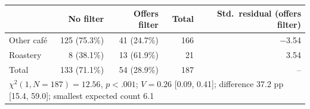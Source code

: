 \begin{tabular}{lrrrr}
\toprule
  & No filter & Offers filter & Total & Std.\ residual (offers filter) \\
\midrule
Other caf\'e & 125 (75.3\%) & 41 (24.7\%) & 166 & \ensuremath{-}3.54 \\
Roastery & 8 (38.1\%) & 13 (61.9\%) &  21 & 3.54 \\
\midrule
Total & 133 (71.1\%) & 54 (28.9\%) & 187 & -- \\
\midrule
\multicolumn{5}{l}{$\chi^2(1, N = 187) = 12.56$, $p < .001$; $V = 0.26$ [0.09, 0.41]; difference 37.2 pp [15.4, 59.0]; smallest expected count 6.1} \\
\bottomrule
\end{tabular}

